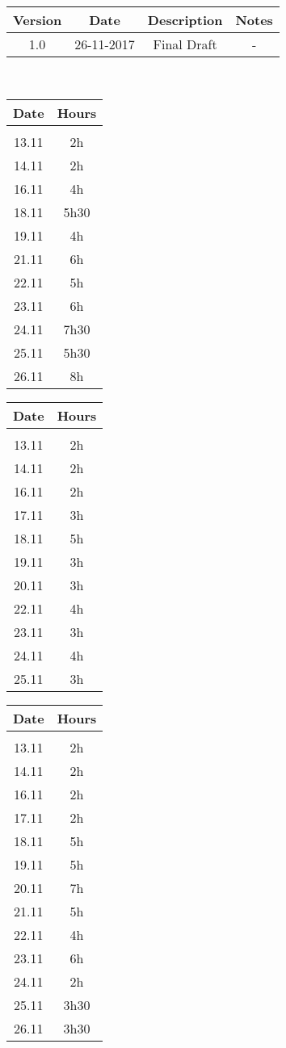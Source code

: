 \vspace{0.5cm}
\begin{tabular}[H]{c|c|c|c}
	Version & Date & Description & Notes\\
	\hline
	\rule{0pt}{4ex}1.0	&	26-11-2017	&	Final Draft	&	-
\end{tabular}
\vspace{0.5cm}\\

\vspace{0.5cm}
\begin{tabular}[H]{c|c}
	Date & Hours\\
	\hline\\
	13.11	&	2h\\
	14.11	&	2h\\
	16.11	&	4h\\
	18.11	&	5h30\\
	19.11	&	4h\\
	21.11	&	6h\\
	22.11	&	5h\\
	23.11	&	6h\\
	24.11	&	7h30\\
	25.11	&	5h30\\
	26.11	&	8h
\end{tabular}

\vspace{0.5cm}
\begin{tabular}[H]{c|c}
	Date & Hours\\
	\hline\\
	13.11	&	2h\\
	14.11	&	2h\\
	16.11	&	2h\\
	17.11	&	3h\\
	18.11	&	5h\\
	19.11	&	3h\\
	20.11	&	3h\\
	22.11	&	4h\\
	23.11	&	3h\\
	24.11	&	4h\\
	25.11	&	3h
\end{tabular}

\vspace{0.5cm}
\begin{tabular}[H]{c|c}
	Date & Hours\\
	\hline\\
	13.11	&	2h\\
	14.11	&	2h\\
	16.11	&	2h\\
	17.11	&	2h\\
	18.11	&	5h\\
	19.11	&	5h\\
	20.11	&	7h\\
	21.11	&	5h\\
	22.11	&	4h\\
	23.11	&	6h\\
	24.11	&	2h\\
	25.11	&	3h30\\
	26.11	&	3h30
\end{tabular}